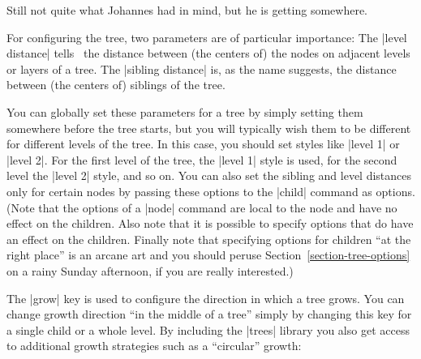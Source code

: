 Still not quite what Johannes had in mind, but he is getting somewhere.

For configuring the tree, two parameters are of particular importance: The
|level distance| tells \tikzname\ the distance between (the centers of) the
nodes on adjacent levels or layers of a tree. The |sibling distance| is, as the
name suggests, the distance between (the centers of) siblings of the tree.

You can globally set these parameters for a tree by simply setting them
somewhere before the tree starts, but you will typically wish them to be
different for different levels of the tree. In this case, you should set styles
like |level 1| or |level 2|. For the first level of the tree, the |level 1|
style is used, for the second level the |level 2| style, and so on. You can
also set the sibling and level distances only for certain nodes by passing
these options to the |child| command as options. (Note that the options of a
|node| command are local to the node and have no effect on the children. Also
note that it is possible to specify options that do have an effect on the
children. Finally note that specifying options for children ``at the right
place'' is an arcane art and you should peruse
Section~\ref{section-tree-options} on a rainy Sunday afternoon, if you are
really interested.)

The |grow| key is used to configure the direction in which a tree grows. You
can change growth direction ``in the middle of a tree'' simply by changing this
key for a single child or a whole level. By including the |trees| library you
also get access to additional growth strategies such as a ``circular'' growth:

